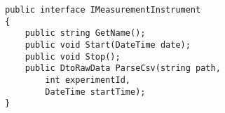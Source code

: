 \begin{lstlisting}[caption=The interface used to implement the measurement instruments, label={lst:measurement_instruments}]
public interface IMeasurementInstrument
{
    public string GetName();
    public void Start(DateTime date);
    public void Stop();
    public DtoRawData ParseCsv(string path, 
        int experimentId, 
        DateTime startTime);
}
\end{lstlisting}